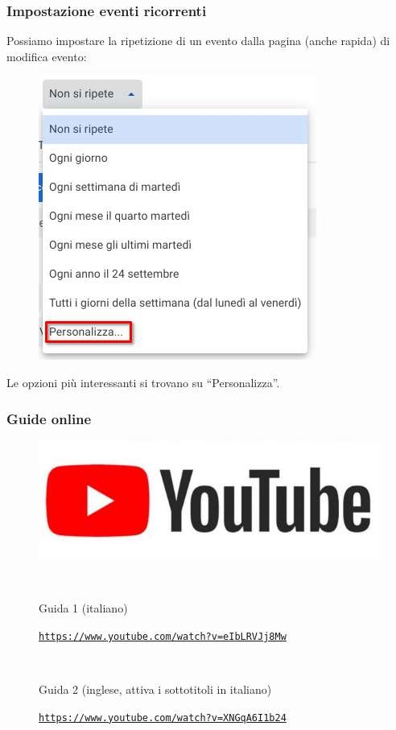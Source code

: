 \documentclass[]{beamer}
\begin{document}
\begin{frame}
\frametitle{Impostazione eventi ricorrenti}
Possiamo impostare la ripetizione di un evento dalla pagina (anche rapida) di modifica evento:
\begin{figure}
  \includegraphics[width=.4\columnwidth]{img/calendarricorrente.png}
\end{figure}
Le opzioni più interessanti si trovano su ``Personalizza''.
\end{frame}




\begin{frame}
\frametitle{Guide online}
\begin{figure}
\includegraphics[width=.5\columnwidth]{img/ytlogo.jpg}

~

Guida 1 (italiano)

\href{https://www.youtube.com/watch?v=eIbLRVJj8Mw}{\texttt{https://www.youtube.com/watch?v=eIbLRVJj8Mw}}

~

Guida 2 (inglese, attiva i sottotitoli in italiano)

\href{https://www.youtube.com/watch?v=XNGqA6I1b24}{\texttt{https://www.youtube.com/watch?v=XNGqA6I1b24}}
\end{figure}
\end{frame}
\end{document}
